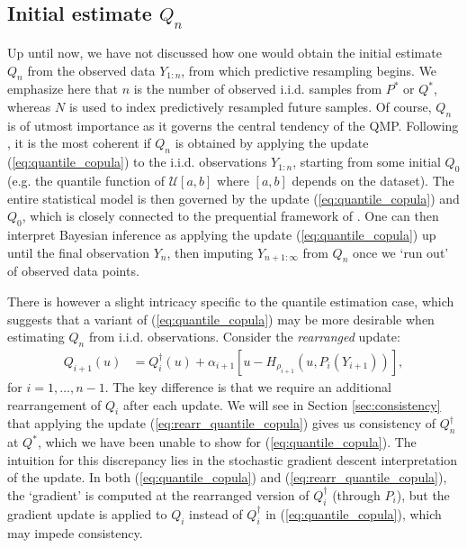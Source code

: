 \documentclass[11pt,a4paper]{article}
\begin{document}
\subsection{Initial estimate $Q_n$}\label{sec:initial}
Up until now, we have not discussed how one would obtain the initial estimate $Q_n$ from the observed data $Y_{1:n}$, from which predictive resampling begins. We emphasize here that $n$ is the number of observed i.i.d. samples from $P^*$ or $Q^*$, whereas $N$ is used to index predictively resampled future samples. Of course, $Q_n$ is of utmost importance as it governs the central tendency of the QMP. 
Following \cite{Fong2023a}, it is the most coherent if $Q_n$ is obtained by applying the update (\ref{eq:quantile_copula}) to the i.i.d. observations $Y_{1:n}$, starting from some initial $Q_0$ (e.g. the quantile function of $\mathcal{U}[a,b]$ where $[a,b]$ depends on the dataset). The entire statistical model is then governed by the update (\ref{eq:quantile_copula}) and $Q_0$, which is closely connected to the prequential framework of \cite{Dawid1984}. One can then interpret Bayesian inference as applying the update (\ref{eq:quantile_copula}) up until the final observation $Y_n$, then imputing $Y_{n+1:\infty}$ from $Q_n$ once we `run out' of observed data points.

There is however a slight intricacy specific to the quantile estimation case, which suggests that a variant of (\ref{eq:quantile_copula}) may be more desirable when estimating $Q_n$ from i.i.d. observations. Consider the \textit{rearranged} update:
\begin{align}\label{eq:rearr_quantile_copula}
    Q_{i+1}(u) &= Q^{\dagger}_i(u) + \alpha_{i+1}\left[u - H_{\rho_{i+1}}\left(u, P_i(Y_{i+1})\right)\right],
\end{align}
for $i = 1,\ldots,n-1$. The key difference is that we require an additional rearrangement of $Q_i$ after each update. We will see in Section \ref{sec:consistency} that applying the update (\ref{eq:rearr_quantile_copula})  gives us consistency of $Q_n^{\dagger}$ at $Q^*$, which we have been unable to show for (\ref{eq:quantile_copula}). The intuition for this discrepancy lies in the stochastic gradient descent interpretation of the update. 
In both (\ref{eq:quantile_copula}) and (\ref{eq:rearr_quantile_copula}), the `gradient' is computed at the rearranged version of $Q_i^{\dagger}$ (through $P_i$), but the gradient update is applied to $Q_i$ instead of $Q_i^{\dagger}$ in (\ref{eq:quantile_copula}), which may impede consistency. 
\end{document}
